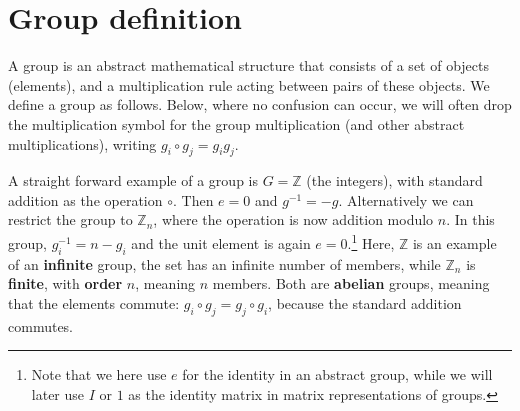 \documentclass[notes.tex]{subfiles}
\begin{document}
\section{Group definition}
A group is an abstract mathematical structure that consists of a set of objects (elements), and a multiplication rule acting between pairs of these objects. We define a group as follows.
Below, where no confusion can occur, we will often drop the multiplication symbol for the group multiplication (and other abstract multiplications), writing $g_i \circ g_j =g_ig_j$.
 
A straight forward example of a group is $G= \mathbb{Z}$ (the integers), with standard addition as the operation $\circ$. Then $e = 0$ and $g^{-1} = -g$. Alternatively we can restrict the group to $\mathbb{Z}_n$, where the operation is now addition modulo $n$. In this group, $g_i^{-1} = n - g_i$ and the unit element is again $e = 0$.\footnote{Note that we here use $e$ for the identity in an abstract group, while we will later use $I$ or $1$ as the identity matrix in matrix representations of groups.} 
Here, $\mathbb{Z}$ is an example of an {\bf infinite} group, the set has an infinite number of members, while $\mathbb{Z}_n$ is {\bf finite}, with {\bf order} $n$, meaning $n$ members. Both are {\bf abelian} groups, meaning that the elements commute: $g_i \circ g_j = g_j \circ g_i$, because the standard addition commutes.
\end{document}
